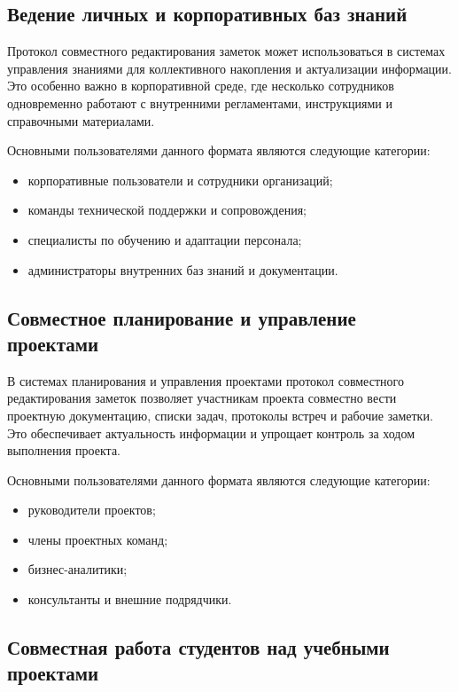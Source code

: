 \subsection*{Ведение личных и корпоративных баз знаний}

Протокол совместного редактирования заметок может использоваться в системах управления знаниями для коллективного накопления и актуализации информации. Это особенно важно в корпоративной среде, где несколько сотрудников одновременно работают с внутренними регламентами, инструкциями и справочными материалами.

Основными пользователями данного формата являются следующие категории:

\begin{itemize}
    \item корпоративные пользователи и сотрудники организаций;
    \item команды технической поддержки и сопровождения;
    \item специалисты по обучению и адаптации персонала;
    \item администраторы внутренних баз знаний и документации.
\end{itemize}

\subsection*{Совместное планирование и управление проектами}

В системах планирования и управления проектами протокол совместного редактирования заметок позволяет участникам проекта совместно вести проектную документацию, списки задач, протоколы встреч и рабочие заметки. Это обеспечивает актуальность информации и упрощает контроль за ходом выполнения проекта.

Основными пользователями данного формата являются следующие категории:

\begin{itemize}
    \item руководители проектов;
    \item члены проектных команд;
    \item бизнес-аналитики;
    \item консультанты и внешние подрядчики.
\end{itemize}

\subsection*{Совместная работа студентов над учебными проектами}

